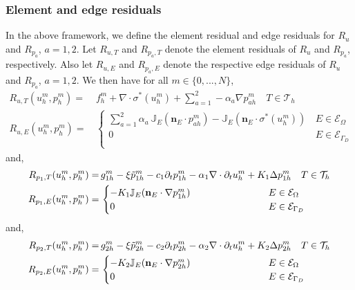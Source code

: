 \subsubsection{Element and edge residuals}
In the above framework, we define the element residual and edge residuals for $R_u$ and $R_{p_a}$, $a=1,2$. Let $R_{u,T}$ and $R_{p_a,T}$ denote the element residuals of $R_u$ and $R_{p_a}$, respectively. Also let $R_{u,E}$ and $R_{p_a,E}$ denote the respective edge residuals of $R_u$ and $R_{p_a}$, $a=1,2$. We then have for all $m\in\{0,...,N\}$,
\begin{align} \label{bb_u_element_edge_res}
R_{u,T}(u^m_h,p^m_h) = & \, f_h^m + \nabla \cdot \sigma^{\ast}(u_h^m) + \sum_{a=1}^2 -\alpha_a \nabla p_{ah}^m  \quad  T \in \mathcal{T}_h\\ 
R_{u,E}(u^m_h,p^m_h)  = & \, \begin{cases} 
	\sum_{a=1}^2 \alpha_a \, \mathbb{J}_E(\mathbf{n}_E \cdot p_{ah}^m) - \mathbb{J}_E(\mathbf{n}_E \cdot \sigma^{\ast}(u_h^m)) & \,  E \in \mathcal{E}_\Omega \\
     0 & \, E \in \mathcal{E}_{\Gamma_D} \\
\end{cases}
\end{align} 
and,
\begin{align} \label{bb_p_element_edge_res}
R_{p_1,T}(u^m_h,p^m_h)  = & \, g^m_{1h}  - \xi\tilde{p}_{1h}^m - c_1\partial_t p^m_{1h} - \alpha_1 \nabla \cdot \partial_t u_h^m + K_1 \Delta p_{1h}^m \quad  T \in \mathcal{T}_h\\ 
R_{p_1,E}(u^m_h,p^m_h)  = & \, \begin{cases} 
	- K_1 \mathbb{J}_E(\mathbf{n}_E \cdot \nabla p_{1h}^m)  & \hspace{2.5cm} E \in \mathcal{E}_\Omega \\
     0 & \hspace{2.5cm} E \in \mathcal{E}_{\Gamma_D} \\
\end{cases}
\end{align}
and,
\begin{align} \label{bb_p_element_edge_res}
R_{p_2,T}(u^m_h,p^m_h)  = & \, g^m_{2h}  - \xi\tilde{p}_{2h}^m - c_2\partial_t p^m_{2h} - \alpha_2 \nabla \cdot \partial_t u_h^m + K_2 \Delta p_{2h}^m \quad  T \in \mathcal{T}_h\\ 
R_{p_2,E}(u^m_h,p^m_h)  = & \, \begin{cases} 
	- K_2 \mathbb{J}_E(\mathbf{n}_E \cdot \nabla p_{2h}^m)  & \hspace{2.5cm}  E \in \mathcal{E}_\Omega \\
     0 & \hspace{2.5cm} E \in \mathcal{E}_{\Gamma_D} \\
\end{cases}
\end{align}
